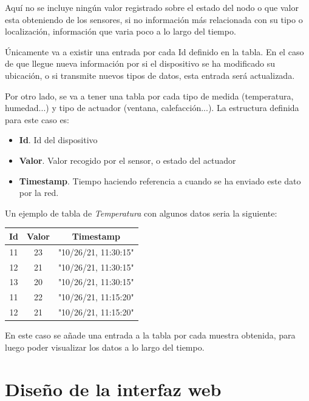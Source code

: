 Aquí no se incluye ningún valor registrado sobre el estado del nodo o que valor esta obteniendo de los sensores, si no información más relacionada con su tipo o localización, información que varia poco a lo largo del tiempo. 

Únicamente va a existir una entrada por cada Id definido en la tabla. En el caso de que llegue nueva información por si el dispositivo se ha modificado su ubicación, o si transmite nuevos tipos de datos, esta entrada será actualizada.

Por otro lado, se va a tener una tabla por cada tipo de medida (temperatura, humedad...) y tipo de actuador (ventana, calefacción...). La estructura definida para este caso es:

\begin{itemize}
    \item \textbf{Id}. Id del dispositivo
    \item \textbf{Valor}. Valor recogido por el sensor, o estado del actuador
    \item \textbf{Timestamp}. Tiempo haciendo referencia a cuando se ha enviado este dato por la red.
\end{itemize}

Un ejemplo de tabla de \textit{Temperatura} con algunos datos seria la siguiente:

\begin{center}
\begin{tabular}{||c c c||} 
 \hline
 Id & Valor & Timestamp \\ [0.5ex] 
 \hline\hline
 11 & 23 & "10/26/21, 11:30:15" \\ 
 \hline
 12 & 21 & "10/26/21, 11:30:15" \\
 \hline
 13 & 20 & "10/26/21, 11:30:15" \\
 \hline
 11 & 22 & "10/26/21, 11:15:20" \\ 
 \hline
 12 & 21 & "10/26/21, 11:15:20" \\


 \hline
\end{tabular}
\end{center}

En este caso se añade una entrada a la tabla por cada muestra obtenida, para luego poder visualizar los datos a lo largo del tiempo.


\section{Diseño de la interfaz web}

